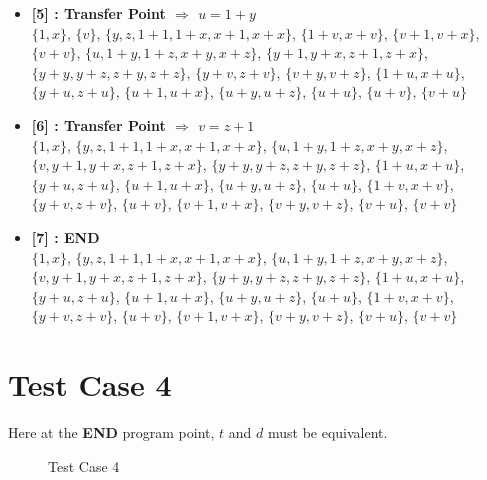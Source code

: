 \begin{itemize}
    \item \textbf{[5] : Transfer Point $\Rightarrow$ $u = 1 + y$}\\
        $\{1, x\}$, $\{v\}$, $\{y, z, 1 + 1, 1 + x, x + 1, x + x\}$, $\{1 + v, x + v\}$, $\{v + 1, v + x\}$, $\{v + v\}$, $\{u, 1 + y, 1 + z, x + y, x + z\}$, $\{y + 1, y + x, z + 1, z + x\}$, $\{y + y, y + z, z + y, z + z\}$, $\{y + v, z + v\}$, $\{v + y, v + z\}$, $\{1 + u, x + u\}$, $\{y + u, z + u\}$, $\{u + 1, u + x\}$, $\{u + y, u + z\}$, $\{u + u\}$, $\{u + v\}$, $\{v + u\}$

    \item \textbf{[6] : Transfer Point $\Rightarrow$ $v = z + 1$}\\
        $\{1, x\}$, $\{y, z, 1 + 1, 1 + x, x + 1, x + x\}$, $\{u, 1 + y, 1 + z, x + y, x + z\}$, $\{v, y + 1, y + x, z + 1, z + x\}$, $\{y + y, y + z, z + y, z + z\}$, $\{1 + u, x + u\}$, $\{y + u, z + u\}$, $\{u + 1, u + x\}$, $\{u + y, u + z\}$, $\{u + u\}$, $\{1 + v, x + v\}$, $\{y + v, z + v\}$, $\{u + v\}$, $\{v + 1, v + x\}$, $\{v + y, v + z\}$, $\{v + u\}$, $\{v + v\}$

    \item \textbf{[7] : END}\\
        $\{1, x\}$, $\{y, z, 1 + 1, 1 + x, x + 1, x + x\}$, $\{u, 1 + y, 1 + z, x + y, x + z\}$, $\{v, y + 1, y + x, z + 1, z + x\}$, $\{y + y, y + z, z + y, z + z\}$, $\{1 + u, x + u\}$, $\{y + u, z + u\}$, $\{u + 1, u + x\}$, $\{u + y, u + z\}$, $\{u + u\}$, $\{1 + v, x + v\}$, $\{y + v, z + v\}$, $\{u + v\}$, $\{v + 1, v + x\}$, $\{v + y, v + z\}$, $\{v + u\}$, $\{v + v\}$

\end{itemize}

\section{Test Case 4}
\label{sec:tc4}
Here at the \textbf{END} program point, $t$ and $d$ must be equivalent.

\begin{figure}[H]
\label{fig:tc4}
    \caption{Test Case 4}
\end{figure}

